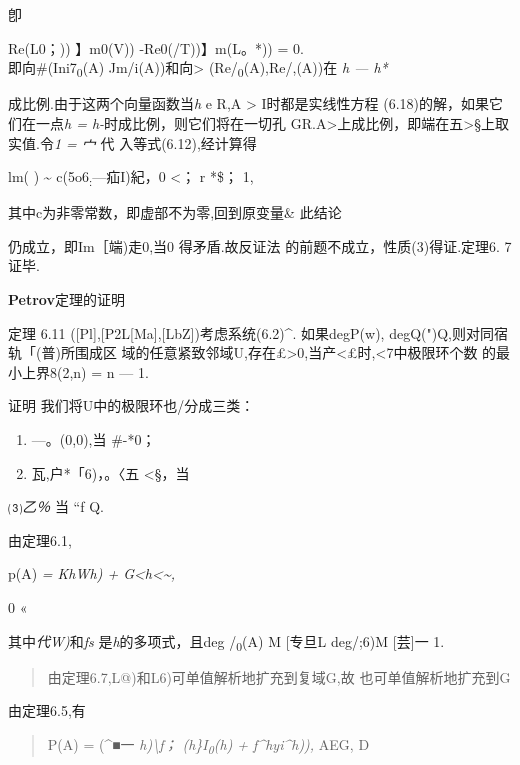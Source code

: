 \documentclass{article}
\begin{document}
卽

Re(L0；)) 】m0(V)) -Re0(/T))】m(L。*)) = 0.\\
即向\#(Ini7\textsubscript{0}(A) Jm/i(A))和向\textgreater{}
(Re/\textsubscript{0}(A),Re/,(A))在 \emph{h --- h*}

成比例.由于这两个向量函数当\emph{h} e R,A \textgreater{}
I时都是实线性方程 (6.18)的解，如果它们在一点\emph{h =
h-}时成比例，则它们将在一切孔
GR.A\textgreater{}\textbar{}上成比例，即端在五\textgreater{}§上取实值.令\emph{1
= 宀} 代 入等式(6.12),经计算得

lm( ) \textasciitilde{} c(5o6\textsubscript{:}---疝I)紀，0 \textless{}；
r *\$； 1,

其中c为非零常数，即虚部不为零,回到原变量\& 此结论

仍成立，即Im［端)走0,当0 得矛盾.故反证法
的前题不成立，性质(3)得证.定理6. 7证毕.\textbar{}

\textbf{Petrov}定理的证明

定理 6.11 ({[}Pl{]},{[}P2L{[}Ma{]},{[}LbZ{]})考虑系统(6.2)\^{}.
如果degP(w), degQ(")Q,则对同宿轨「(普)所围成区
域的任意紧致邻域U,存在£\textgreater{}0,当\textbar{}产\textbar{}\textless{}£时,\textless{}7中极限环个数
的最小上界8(2,n) = n --- 1.

证明 我们将U中的极限环也/分成三类：

\begin{enumerate}
\def\labelenumi{(\arabic{enumi})}
\item
  ---。(0,0),当 \#-*0；
\item
  瓦,户*「6)，。〈五 \textless{}§，当
\end{enumerate}

⑶\emph{乙％} 当 ``f Q.

由定理6.1,

p(A) \emph{= KhWh) + G\textless{}h\textless{}\textasciitilde{},}

0 «

其中\emph{代W)}和\emph{fs} 是\emph{h}的多项式，且deg
/\textsubscript{0}(A) M {[}专旦L deg/;6)M {[}芸{]}一 1.

\begin{quote}
由定理6.7,L@)和L6)可单值解析地扩充到复域G,故 也可单值解析地扩充到G
\end{quote}

由定理6.5,有

\begin{quote}
P(A) = (\^{}■一 \emph{h)\textbackslash{}f； (h\}I\textsubscript{0}(h) +
f\^{}hyi\^{}h)),} AEG, D
\end{quote}
\end{document}
